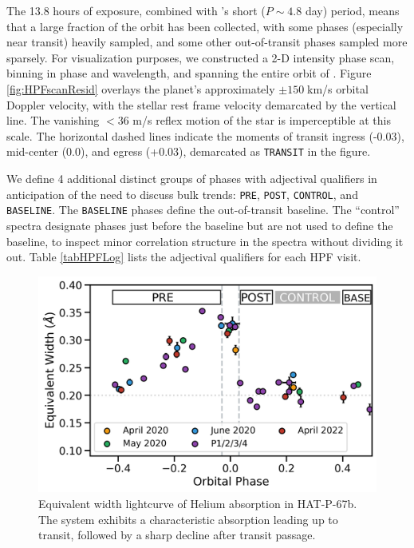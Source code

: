 \documentclass[twocolumn]{aastex631}
\begin{document}
The 13.8 hours of exposure, combined with 's short ($P\sim4.8$ day) period, means that a large fraction of the orbit has been collected, with some phases (especially near transit) heavily sampled, and some other out-of-transit phases sampled more sparsely. For visualization purposes, we constructed a 2-D intensity phase scan, binning in phase and wavelength, and spanning the entire orbit of .  Figure \ref{fig:HPFscanResid} overlays the planet's approximately $\pm150\;$km/s orbital Doppler velocity, with the stellar rest frame velocity demarcated by the vertical line.  The vanishing $<36$ m/s reflex motion of the star is imperceptible at this scale.  The horizontal dashed lines indicate the moments of transit ingress (-0.03), mid-center (0.0), and egress (+0.03), demarcated as \texttt{TRANSIT} in the figure.

We define 4 additional distinct groups of phases with adjectival qualifiers in anticipation of the need to discuss bulk trends: \texttt{PRE}, \texttt{POST}, \texttt{CONTROL}, and \texttt{BASELINE}.  The \texttt{BASELINE} phases define the out-of-transit baseline.  The ``control'' spectra designate phases just before the baseline but are not used to define the baseline, to inspect minor correlation structure in the spectra without dividing it out.  Table \ref{tabHPFLog} lists the adjectival qualifiers for each HPF visit.

\begin{figure}
    \includegraphics[width=\linewidth]{figures/HAT_P_67b_Helium10830EW_byCampaign.png}
    \caption{Equivalent width lightcurve of Helium absorption in HAT-P-67b.  The system exhibits a characteristic absorption leading up to transit, followed by a sharp decline after transit passage.}
    \label{fig:HPFtimeseries}
\end{figure}
\end{document}
